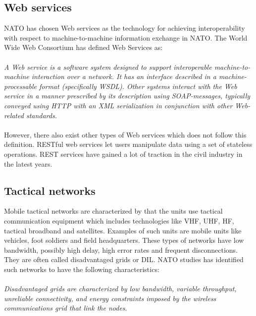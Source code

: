 \documentclass[USenglish]{article}
\begin{document}
\subsection{Web services}
NATO has chosen Web services as the technology for achieving interoperability with respect to machine-to-machine information exchange in NATO. The World Wide Web Consortium has defined Web Services as\cite{wrc-web-service}:
\paragraph{}
\textit{A Web service is a software system designed to support interoperable machine-to-machine interaction over a network. It has an interface described in a machine-processable format (specifically WSDL). Other systems interact with the Web service in a manner prescribed by its description using SOAP-messages, typically conveyed using HTTP with an XML serialization in conjunction with other Web-related standards.}
\paragraph{}
However, there also exist other types of Web services which does not follow this definition. RESTful web services let users manipulate data using a set of stateless operations. REST services have gained a lot of traction in the civil industry in the latest years.


\subsection{Tactical networks}
Mobile tactical networks are characterized by that the units use tactical
communication equipment which includes technologies like VHF, UHF, HF, tactical
broadband and satellites. Examples of such units are mobile units like vehicles,
foot soldiers and field headquarters. These types of networks have low
bandwidth, possibly high delay, high error rates and frequent disconnections.
They are often called disadvantaged grids or DIL. NATO studies has
identified such networks to have the following characteristics:

\paragraph{}
\textit{Disadvantaged grids are characterized by low bandwidth, variable
throughput, unreliable connectivity, and energy constraints imposed by the
wireless communications grid that link the
nodes}\cite{nato-disadvantaged-grids}.
\end{document}
